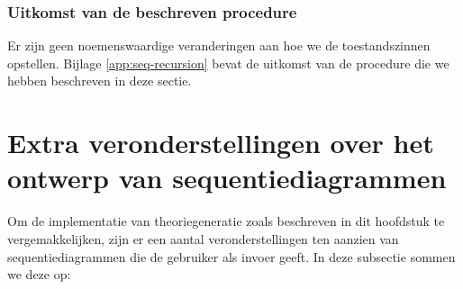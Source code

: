 \subsubsection{Uitkomst van de beschreven procedure}
Er zijn geen noemenswaardige veranderingen aan hoe we de toestandszinnen opstellen. Bijlage \ref{app:seq-recursion} bevat de uitkomst van de procedure die we hebben beschreven in deze sectie. 

\section{Extra veronderstellingen over het ontwerp van sequentiediagrammen}\label{sec:beperkingen}
Om de implementatie van theoriegeneratie zoals beschreven in dit hoofdstuk te vergemakkelijken, zijn er een aantal veronderstellingen ten aanzien van sequentiediagrammen die de gebruiker als invoer geeft. In deze subsectie sommen we deze op:

